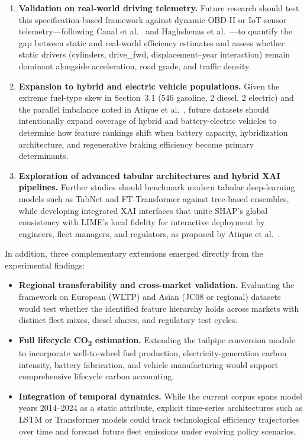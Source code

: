 \begin{enumerate}
    \item \textbf{Validation on real-world driving telemetry.} Future research should test this specification-based framework against dynamic OBD-II or IoT-sensor telemetry---following Canal et al.~\cite{canal2024machine} and Haghshenas et al.~\cite{haghshenas2025fuel}---to quantify the gap between static and real-world efficiency estimates and assess whether static drivers (cylinders, drive\_fwd, displacement--year interaction) remain dominant alongside acceleration, road grade, and traffic density.

    \item \textbf{Expansion to hybrid and electric vehicle populations.} Given the extreme fuel-type skew in Section~3.1 (546 gasoline, 2 diesel, 2 electric) and the parallel imbalance noted in Atique et al.~\cite{atique2026explainable}, future datasets should intentionally expand coverage of hybrid and battery-electric vehicles to determine how feature rankings shift when battery capacity, hybridization architecture, and regenerative braking efficiency become primary determinants.

    \item \textbf{Exploration of advanced tabular architectures and hybrid XAI pipelines.} Further studies should benchmark modern tabular deep-learning models such as TabNet and FT-Transformer against tree-based ensembles, while developing integrated XAI interfaces that unite SHAP's global consistency with LIME's local fidelity for interactive deployment by engineers, fleet managers, and regulators, as proposed by Atique et al.~\cite{atique2026explainable}.
\end{enumerate}

In addition, three complementary extensions emerged directly from the experimental findings:

\begin{itemize}
    \item \textbf{Regional transferability and cross-market validation.} Evaluating the framework on European (WLTP) and Asian (JC08 or regional) datasets would test whether the identified feature hierarchy holds across markets with distinct fleet mixes, diesel shares, and regulatory test cycles.

    \item \textbf{Full lifecycle CO\textsubscript{2} estimation.} Extending the tailpipe conversion module to incorporate well-to-wheel fuel production, electricity-generation carbon intensity, battery fabrication, and vehicle manufacturing would support comprehensive lifecycle carbon accounting.

    \item \textbf{Integration of temporal dynamics.} While the current corpus spans model years 2014--2024 as a static attribute, explicit time-series architectures such as LSTM or Transformer models could track technological efficiency trajectories over time and forecast future fleet emissions under evolving policy scenarios.
\end{itemize}


